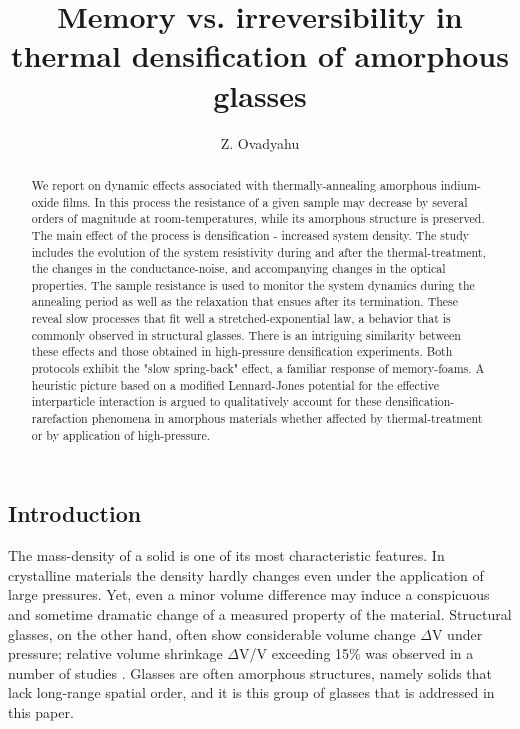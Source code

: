 \documentclass
[preprint,showpacs,byrevtex,10pt,twocolumn,tightenlines,prl,letterpaper]{revtex4}%
\begin{document}
\preprint{ }
\title{Memory vs. irreversibility in thermal densification of amorphous glasses}
\author{Z. Ovadyahu}


\begin{abstract}
We report on dynamic effects associated with thermally-annealing amorphous
indium-oxide films. In this process the resistance of a given sample may
decrease by several orders of magnitude at room-temperatures, while its
amorphous structure is preserved. The main effect of the process is
densification - increased system density. The study includes the evolution of
the system resistivity during and after the thermal-treatment, the changes in
the conductance-noise, and accompanying changes in the optical properties. The
sample resistance is used to monitor the system dynamics during the annealing
period as well as the relaxation that ensues after its termination. These
reveal slow processes that fit well a stretched-exponential law, a behavior
that is commonly observed in structural glasses. There is an intriguing
similarity between these effects and those obtained in high-pressure
densification experiments. Both protocols exhibit the "slow spring-back"
effect, a familiar response of memory-foams. A heuristic picture based on a
modified Lennard-Jones potential for the effective interparticle interaction
is argued to qualitatively account for these densification-rarefaction
phenomena in amorphous materials whether affected by thermal-treatment or by
application of high-pressure.

\end{abstract}
\maketitle


\subsection{Introduction}

The mass-density of a solid is one of its most characteristic features. In
crystalline materials the density hardly changes even under the application of
large pressures. Yet, even a minor volume difference may induce a conspicuous
and sometime dramatic change of a measured property of the material.
Structural glasses, on the other hand, often show considerable volume change
$\Delta$V under pressure; relative volume shrinkage $\Delta$V/V exceeding 15\%
was observed in a number of studies \cite{1,2,3,4,5,6,7,8,9,10,11,12,13}.
Glasses are often amorphous structures, namely solids that lack long-range
spatial order, and it is this group of glasses that is addressed in this paper.
\end{document}
